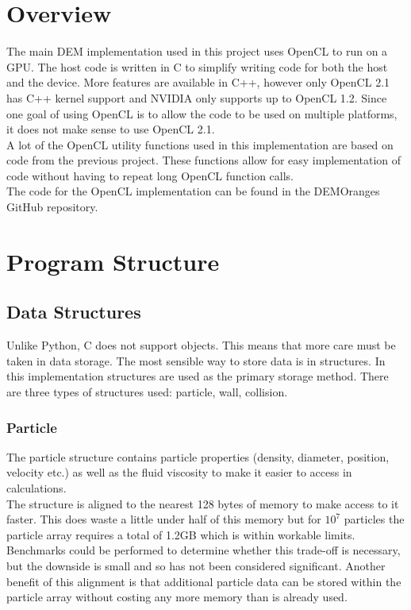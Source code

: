 \documentclass[a4paper,11pt,titlepage]{report}
\begin{document}
\section{Overview}
The main DEM implementation used in this project uses OpenCL to run on a GPU. The host code is written in C to simplify writing code for both the host and the device. More features are available in C++, however only OpenCL 2.1 has C++ kernel support and NVIDIA only supports up to OpenCL 1.2. Since one goal of using OpenCL is to allow the code to be used on multiple platforms, it does not make sense to use OpenCL 2.1.
\\A lot of the OpenCL utility functions used in this implementation are based on code from the previous project\cite{achow}. These functions allow for easy implementation of code without having to repeat long OpenCL function calls.
\\The code for the OpenCL implementation can be found in the DEMOranges GitHub repository\cite{DEMOranges}.
\section{Program Structure}
\subsection{Data Structures}
Unlike Python, C does not support objects. This means that more care must be taken in data storage. The most sensible way to store data is in structures. In this implementation structures are used as the primary storage method. There are three types of structures used: particle, wall, collision.
\subsubsection{Particle}
The particle structure contains particle properties (density, diameter, position, velocity etc.) as well as the fluid viscosity to make it easier to access in calculations.
\\The structure is aligned to the nearest 128 bytes of memory to make access to it faster. This does waste a little under half of this memory but for $10^7$ particles the particle array requires a total of 1.2GB which is within workable limits. Benchmarks could be performed to determine whether this trade-off is necessary, but the downside is small and so has not been considered significant. Another benefit of this alignment is that additional particle data can be stored within the particle array without costing any more memory than is already used.
\end{document}
